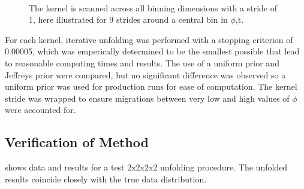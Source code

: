\begin{figure}[H]
            \\
            \caption[Kernel Stride Across $\phi$,t]{The kernel is scanned across all binning dimensions with a stride of 1, here illustrated for 9 strides around a central bin in $\phi$,t.}
            \label{fig:ibut_scan}
        \end{figure}


        For each kernel, iterative unfolding was performed with a stopping criterion of 0.00005, which was emperically determined to be the smallest possible that lead to reasonable computing times and results. The use of a uniform prior and Jeffreys prior were compared, but no significant difference was observed so a uniform prior was used for production runs for ease of computation. The kernel stride was wrapped to ensure migrations between very low and high values of $\phi$ were accounted for. 

        
        


    \subsection{Verification of Method}

             shows data and results for a test 2x2x2x2 unfolding procedure. The unfolded results coincide closely with the true data distribution. 
    
